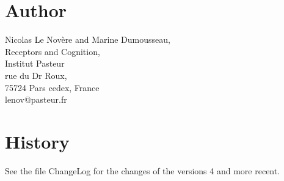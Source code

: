 \documentclass{article}
\begin{document}
\section{Author }
Nicolas Le Nov\`ere and Marine Dumousseau, \\
Receptors and Cognition, \\ 
Institut Pasteur \\
rue du Dr Roux, \\
75724 Pars cedex, France \\
lenov@pasteur.fr 
  
\section{History }

See the file ChangeLog for the changes of the versions 4 and more recent.
\end{document}
